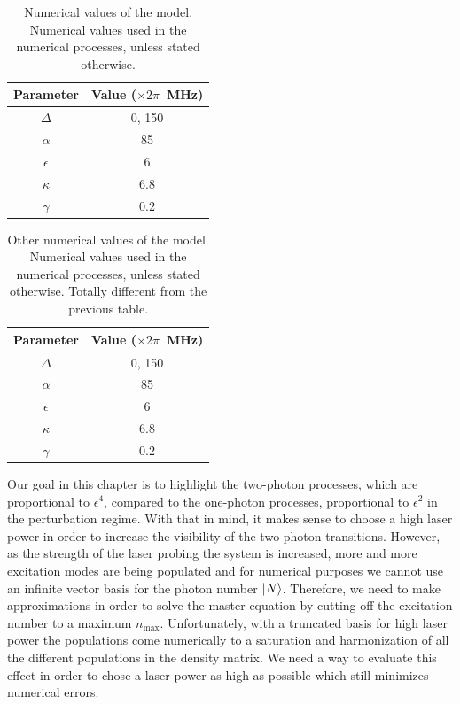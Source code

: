\begin{table} \begin{center}
        \caption{Numerical values of the model. Numerical values used in the numerical processes, unless stated otherwise.}
        \begin{tabular}{c|c}
            Parameter    & Value ($\times 2 \pi$~MHz) \\ \hline \hline
            $\Delta$     & 0, 150                     \\
            ${\alpha}$   & 85                         \\
            ${\epsilon}$ & 6                          \\
            ${\kappa}$   & 6.8                        \\
            ${\gamma}$   & 0.2
        \end{tabular}
        \label{tab-values}
    \end{center}\end{table}


\begin{table} \begin{center}
        \caption{Other numerical values of the model. Numerical values used in the numerical processes, unless stated otherwise. Totally different from the previous table.}
        \begin{tabular}{c|c}
            Parameter    & Value ($\times 2 \pi$~MHz) \\ \hline \hline
            $\Delta$     & 0, 150                     \\
            ${\alpha}$   & 85                         \\
            ${\epsilon}$ & 6                          \\
            ${\kappa}$   & 6.8                        \\
            ${\gamma}$   & 0.2
        \end{tabular}
        \label{tab-values2}
    \end{center}\end{table}

Our goal in this chapter is to highlight the two-photon processes, which are proportional to $\epsilon^4$, compared to the one-photon processes, proportional to $\epsilon^2$ in the perturbation regime. With that in mind, it makes sense to choose a high laser power in order to increase the visibility of the two-photon transitions. However, as the strength of the laser probing the system is increased, more and more excitation modes are being populated and for numerical purposes we cannot use an infinite vector basis for the photon number $| N \rangle$. Therefore, we need to make approximations in order to solve the master equation by cutting off the excitation number to a maximum $n_{\mbox{max}}$. Unfortunately, with a truncated basis for high laser power the populations come numerically to a saturation and harmonization of all the different populations in the density matrix. We need a way to evaluate this effect in order to chose a laser power as high as possible which still minimizes numerical errors.

